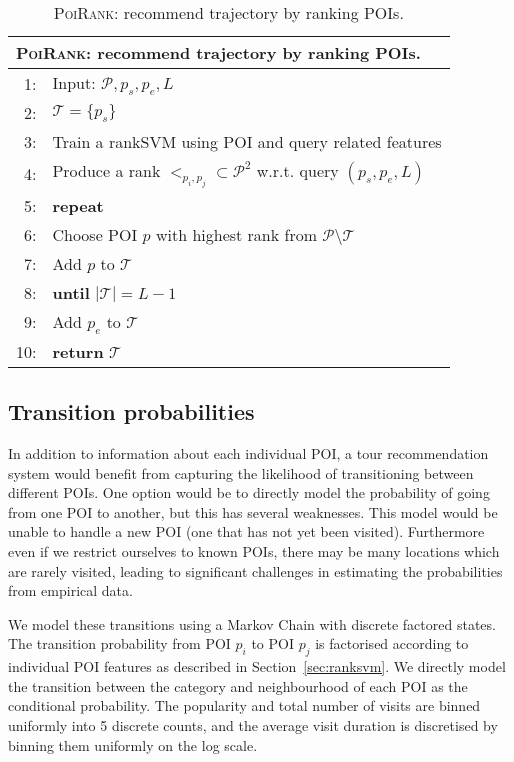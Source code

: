 \begin{table}
\centering
\small
\begin{tabular}{rl}
\hline
\multicolumn{2}{l}{\textsc{PoiRank}: recommend trajectory by ranking POIs.} \\
\hline
 1:& Input: $\mathcal{P}, p_s, p_e, L$ \\
 2:& $\mathcal{T} = \{p_s\}$ \\
 3:& Train a rankSVM using POI and query related features \\
 4:& Produce a rank $<_{p_i, p_j} \subset \mathcal{P}^2$ w.r.t. query $(p_s, p_e, L)$\\
 5:& \textbf{repeat} \\
 6:&\hspace{10pt} Choose POI $p$ with highest rank from $\mathcal{P} \setminus \mathcal{T}$ \\
 7:&\hspace{10pt} Add $p$ to $\mathcal{T}$ \\
 8:&\textbf{until} $|\mathcal{T}| = L-1$ \\
 9:& Add $p_e$ to $\mathcal{T}$ \\
10:& \textbf{return} $\mathcal{T}$ \\
\hline
\end{tabular}
\caption{\textsc{PoiRank}: recommend trajectory by ranking POIs.}
\label{alg:poirank}
\end{table}


\subsection{Transition probabilities}
\label{sec:transition}

In addition to information about each individual POI, a tour recommendation system would benefit
from capturing the likelihood of transitioning between different POIs. One option would be to
directly model the probability of going from one POI to another, but this has several weaknesses.
This model would be unable to handle a new POI (one that has not yet been visited).
Furthermore even if we restrict ourselves to known POIs, there may be many locations which
are rarely visited, leading to significant challenges in estimating the probabilities from
empirical data.

We model these transitions using a Markov Chain with discrete factored states.
The transition probability from POI $p_i$ to POI $p_j$ is factorised according to
individual POI features as described in Section~\ref{sec:ranksvm}. We directly model
the transition between the category and neighbourhood of each POI as the conditional probability.
The popularity and total number of visits are binned uniformly into 5 discrete counts,
and the average visit duration is discretised by binning them uniformly on the log scale.

